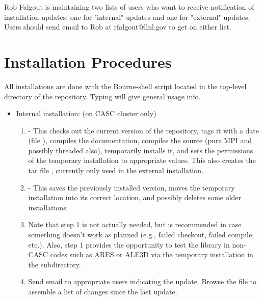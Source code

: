 Rob Falgout is maintaining two lists of users who want to receive
notification of installation updates: one for "internal" updates and
one for "external" updates.  Users should send email to Rob at
rfalgout@llnl.gov to get on either list.

\section{Installation Procedures}
\label{Installation Procedures}

All installations are done with the  Bourne-shell script
located in the top-level directory of the \hypre{} repository.  Typing
 will give general usage info.
\begin{itemize}

\item Internal installation: (on CASC cluster only)
\begin{enumerate}

   \item {} - This checks out the current version
   of the repository, tags it with a date (file ),
   compiles the documentation, compiles the source (pure MPI and
   possibly threaded also), temporarily installs it, and sets the
   permissions of the temporary installation to appropriate values.
   This also creates the tar file , currently only
   used in the external installation.
  
   \item {} - This saves the previously
   installed version, moves the temporary installation into its
   correct location, and possibly deletes some older installations.
  
   \item Note that step 1 is not actually needed, but is recommended
   in case something doesn't work as planned (e.g., failed checkout,
   failed compile, etc.).  Also, step 1 provides the opportunity to
   test the library in non-CASC codes such as ARES or ALE3D via the
   temporary installation in the  subdirectory.
  
   \item Send email to appropriate users indicating the update.
   Browse the  file to assemble a list
   of changes since the last update.

\end{enumerate}


\end{itemize}
